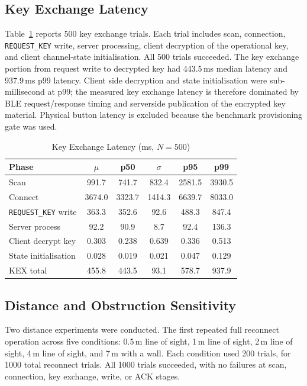 \documentclass[journal]{IEEEtran}
\begin{document}
\subsection{Key Exchange Latency}

Table~\ref{tab:key_exchange_latency} reports 500 key exchange trials. Each trial includes scan, connection, \texttt{REQUEST\_KEY} write, server processing, client decryption of the operational key, and client channel-state initialisation. All 500 trials succeeded. The key exchange portion from request write to decrypted key had 443.5\,ms median latency and 937.9\,ms p99 latency. Client side decryption and state initialisation were sub-millisecond at p99; the measured key exchange latency is therefore dominated by BLE request/response timing and serverside publication of the encrypted key material. Physical button latency is excluded because the benchmark provisioning gate was used.

\begin{table}[!t]
\renewcommand{\arraystretch}{1.15}
\setlength{\tabcolsep}{3pt}
\caption{Key Exchange Latency (ms, $N=500$)}
\label{tab:key_exchange_latency}
\centering
\scriptsize
\begin{tabular}{lccccc}
\toprule
\textbf{Phase} & $\mu$ & \textbf{p50} & $\sigma$ & \textbf{p95} & \textbf{p99} \\
\midrule
Scan & 991.7 & 741.7 & 832.4 & 2581.5 & 3930.5 \\
Connect & 3674.0 & 3323.7 & 1414.3 & 6639.7 & 8033.0 \\
\texttt{REQUEST\_KEY} write & 363.3 & 352.6 & 92.6 & 488.3 & 847.4 \\
Server process & 92.2 & 90.9 & 8.7 & 92.4 & 136.3 \\
Client decrypt key & 0.303 & 0.238 & 0.639 & 0.336 & 0.513 \\
State initialisation & 0.028 & 0.019 & 0.021 & 0.047 & 0.129 \\
KEX total & 455.8 & 443.5 & 93.1 & 578.7 & 937.9 \\
\bottomrule
\end{tabular}
\end{table}

\subsection{Distance and Obstruction Sensitivity}

Two distance experiments were conducted. The first repeated full reconnect operation across five conditions: 0.5\,m line of sight, 1\,m line of sight, 2\,m line of sight, 4\,m line of sight, and 7\,m with a wall. Each condition used 200 trials, for 1000 total reconnect trials. All 1000 trials succeeded, with no failures at scan, connection, key exchange, write, or ACK stages.
\end{document}
